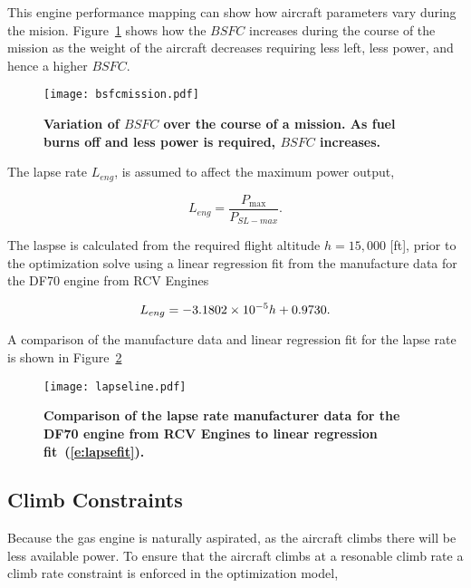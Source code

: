 \documentclass[]{aiaa-tc}%
\begin{document}
This engine performance mapping can show how aircraft parameters vary during the mision. 
Figure~\ref{f:bsfcmission} shows how the $BSFC$ increases during the course of the mission as the weight of the aircraft decreases requiring less left, less power, and hence a higher $BSFC$.

\begin{figure}[H]
	\begin{center}
	\texttt{[image: bsfcmission.pdf]}
    \caption{ \textbf{Variation of $BSFC$ over the course of a mission. As fuel burns off and less power is required, $BSFC$ increases. }}
	\label{f:bsfcmission}
	\end{center}
\end{figure}

The lapse rate $L_{eng}$, is assumed to affect the maximum power output,

\begin{equation}
    \label{e:lapse}
    L_{eng} = \frac{P_{\text{max}}}{P_{SL-max}}.
\end{equation}

The laspse is calculated from the required flight altitude $h=15,000$ [ft], prior to the optimization solve using a linear regression fit from the manufacture data for the DF70 engine from RCV Engines

\begin{equation}
    \label{e:lapsefit}
    L_{eng} = \num{-3.1802d-5} h + 0.9730.
\end{equation}

A comparison of the manufacture data and linear regression fit for the lapse rate is shown in Figure~\ref{f:lapsefit}

\begin{figure}[H]
	\begin{center}
	\texttt{[image: lapseline.pdf]}
    \caption{ \textbf{ Comparison of the lapse rate manufacturer data for the DF70 engine from RCV Engines to linear regression fit~(\eqref{e:lapsefit}).}}
	\label{f:lapsefit}
	\end{center}
\end{figure}

\subsection{Climb Constraints}

Because the gas engine is naturally aspirated, as the aircraft climbs there will be less available power.  
To ensure that the aircraft climbs at a resonable climb rate a climb rate constraint is enforced in the optimization model, 
\end{document}
